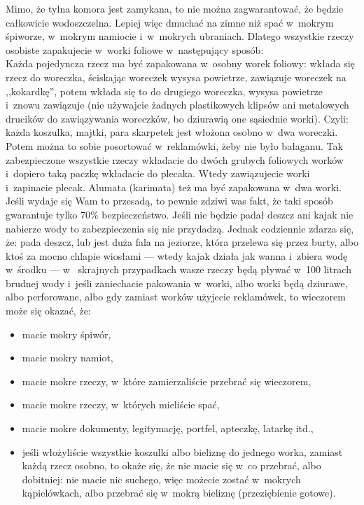 Mimo, że tylna komora jest zamykana, to nie można zagwarantować, że będzie całkowicie wodoszczelna. Lepiej więc dmuchać na zimne niż spać w~mokrym śpiworze, w~mokrym namiocie i~w~mokrych ubraniach. Dlatego wszystkie rzeczy osobiste zapakujecie w~worki foliowe w~następujący sposób:\\
Każda pojedyncza rzecz ma być zapakowana w~osobny worek foliowy: wkłada się rzecz do woreczka, ściskając woreczek wysysa powietrze, zawiązuje woreczek na ,,kokardkę'', potem wkłada się to do drugiego woreczka, wysysa powietrze i~znowu zawiązuje (nie używajcie żadnych plastikowych klipsów ani metalowych drucików do zawiązywania woreczków, bo dziurawią one sąsiednie worki). Czyli: każda koszulka, majtki, para skarpetek jest włożona osobno w~dwa woreczki. Potem można to sobie posortować w~reklamówki, żeby nie było bałaganu. Tak zabezpieczone wszystkie rzeczy wkładacie do dwóch grubych foliowych worków i~dopiero taką paczkę wkładacie do plecaka. Wtedy zawiązujecie worki i~zapinacie plecak. Alumata (karimata) też ma być zapakowana w~dwa worki. Jeśli wydaje się Wam to przesadą, to pewnie zdziwi was fakt, że taki sposób gwarantuje tylko 70\% bezpieczeństwo. Jeśli nie będzie padał deszcz ani kajak nie nabierze wody to zabezpieczenia się nie przydadzą. Jednak codziennie zdarza się, że: pada deszcz, lub jest duża fala na jeziorze, która przelewa się przez burty, albo ktoś za mocno chlapie wiosłami --- wtedy kajak działa jak wanna i~zbiera wodę w~środku --- w~ skrajnych przypadkach wasze rzeczy będą pływać w~100 litrach brudnej wody i~jeśli zaniechacie pakowania w~worki, albo worki będą dziurawe, albo perforowane, albo gdy zamiast worków użyjecie reklamówek, to wieczorem może się okazać, że:
\begin{itemize}
\item macie mokry śpiwór,
\item macie mokry namiot,
\item macie mokre rzeczy, w~które zamierzaliście przebrać się wieczorem,
\item macie mokre rzeczy, w~których mieliście spać,
\item macie mokre dokumenty, legitymację, portfel, apteczkę, latarkę itd.,
\item jeśli włożyliście wszystkie koszulki albo bieliznę do jednego worka, zamiast każdą rzecz osobno, to okaże się, że nie macie się w~co przebrać, albo dobitniej: nie macie nic suchego, więc możecie zostać w~mokrych kąpielówkach, albo przebrać się w~mokrą bieliznę (przeziębienie gotowe).
\end{itemize}
